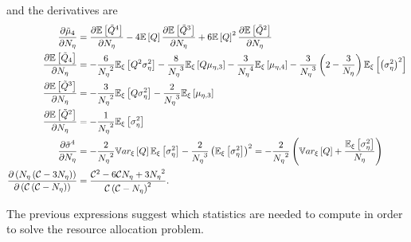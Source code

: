 and the derivatives are
\begin{equation}\label{eq:dEQ_tilde-dNeta}
 \begin{split}
  \frac{ \partial  \tilde{\mu}_4  }{ \partial  {N_\eta}  } &= \frac{ \partial  \mathbb{E}\left[\tilde{Q}^4\right]  }{ \partial  {N_\eta}  } - 4 \mathbb{E}\left[Q\right] \frac{ \partial  \mathbb{E}\left[\tilde{Q}^3\right]  }{ \partial  {N_\eta}  } + 6 \mathbb{E}\left[Q\right]^2 \frac{ \partial  \mathbb{E}\left[\tilde{Q}^2\right]  }{ \partial  {N_\eta}  } \\
  \frac{ \partial  \mathbb{E}\left[\tilde{Q}_4\right]  }{ \partial  {N_\eta}  } &= - \frac{6}{{N_\eta}^2} \mathbb{E}_\xi\left[ Q^2 \sigma^2_\eta \right] - \frac{ 8 }{ {N_\eta}^3 } \mathbb{E}_\xi\left[ Q \mu_{\eta,3} \right] - \frac{ 3 }{ {N_\eta}^4 } \mathbb{E}_\xi\left[ \mu_{\eta,4} \right] 
                                      - \frac{3}{{N_\eta}^3} \left( 2 - \frac{3}{{N_\eta}} \right) \mathbb{E}_\xi\left[ \left( \sigma^2_\eta \right)^2 \right] \\
  \frac{ \partial  \mathbb{E}\left[\tilde{Q}^3\right]  }{ \partial  {N_\eta}  } &= - \frac{ 3 }{ {N_\eta}^2 } \mathbb{E}_\xi\left[ Q \sigma^2_\eta \right] - \frac{ 2 }{ {N_\eta}^3 } \mathbb{E}_\xi\left[ \mu_{\eta,3} \right] \\  
  \frac{ \partial  \mathbb{E}\left[\tilde{Q}^2\right]  }{ \partial  {N_\eta}  } &= - \frac{1}{{N_\eta}^2} \mathbb{E}_\xi\left[ \sigma^2_\eta \right] \\
  \frac{ \partial  \tilde{\sigma}^4  }{ \partial  {N_\eta}  }      &= - \frac{2}{{N_\eta}^2} \mathbb{V}ar_\xi\left[Q\right] \mathbb{E}_\xi\left[\sigma^2_\eta\right] - \frac{2}{{N_\eta}^3} \left( \mathbb{E}_\xi\left[ \sigma^2_\eta \right] \right)^2 = - \frac{2}{{N_\eta}^2} \left( \mathbb{V}ar_\xi\left[Q\right] + \frac{ \mathbb{E}_\xi\left[\sigma^2_\eta\right] }{ {N_\eta} } \right)\\
  \frac{ \partial  \left({N_\eta} \left( \mathcal{C} - 3 {N_\eta} \right) \right)  }{ \partial  \left( \mathcal{C} \left( \mathcal{C} - {N_\eta} \right) \right)  } &= \frac{ \mathcal{C}^2 - 6 \mathcal{C} {N_\eta} + 3 {N_\eta}^2}{ \mathcal{C} \left( \mathcal{C} - {N_\eta} \right)^2 }.
 \end{split}
\end{equation}

\noindent The previous expressions suggest which statistics are needed to compute in order to solve the resource allocation problem.

